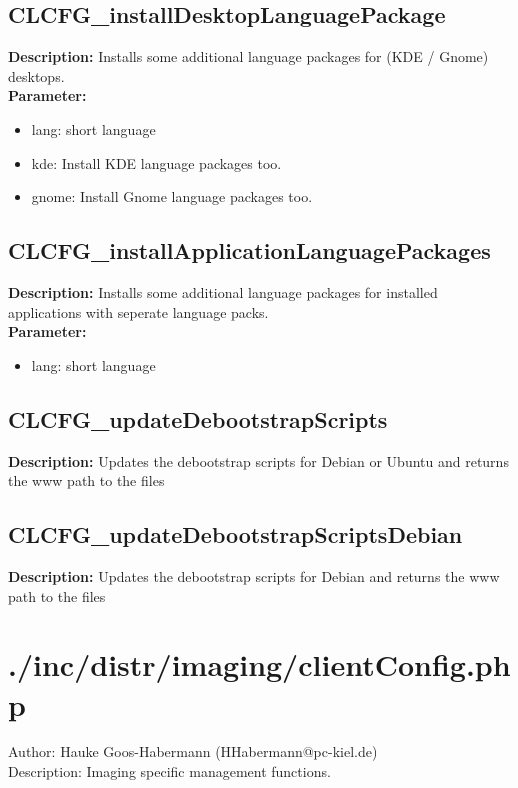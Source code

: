 \subsection{CLCFG\_installDesktopLanguagePackage}
\textbf{Description:} Installs some additional language packages for (KDE / Gnome) desktops.\\
\textbf{Parameter:}
\begin{itemize}
\item lang: short language
\item kde: Install KDE language packages too.
\item gnome: Install Gnome language packages too.
\end{itemize}

\subsection{CLCFG\_installApplicationLanguagePackages}
\textbf{Description:} Installs some additional language packages for installed applications with seperate language packs.\\
\textbf{Parameter:}
\begin{itemize}
\item lang: short language
\end{itemize}

\subsection{CLCFG\_updateDebootstrapScripts}
\textbf{Description:} Updates the debootstrap scripts for Debian or Ubuntu and returns the www path to the files\\

\subsection{CLCFG\_updateDebootstrapScriptsDebian}
\textbf{Description:} Updates the debootstrap scripts for Debian and returns the www path to the files\\

\newpage\section{./inc/distr/imaging/clientConfig.php}
 Author: Hauke Goos-Habermann (HHabermann@pc-kiel.de)\\
 Description: Imaging specific management functions.\\


